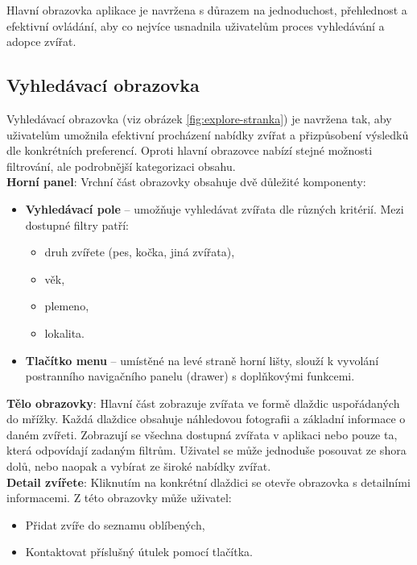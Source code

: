 \documentclass[czech, bp, kiv, he, iso690numb, pdf]{fasthesis}
\begin{document}
    \noindent Hlavní obrazovka aplikace je navržena s důrazem na jednoduchost, přehlednost a efektivní ovládání, aby co nejvíce usnadnila uživatelům proces vyhledávání a adopce zvířat.

    \subsection{Vyhledávací obrazovka}

    \noindent Vyhledávací obrazovka (viz obrázek \ref{fig:explore-stranka}) je navržena tak, aby uživatelům umožnila efektivní procházení nabídky zvířat a přizpůsobení výsledků dle konkrétních preferencí. Oproti hlavní obrazovce nabízí stejné možnosti filtrování, ale podrobnější kategorizaci obsahu.\\

    \noindent \textbf{Horní panel}: Vrchní část obrazovky obsahuje dvě důležité komponenty:

    \begin{itemize}[leftmargin=2em]
        \item \textbf{Vyhledávací pole} – umožňuje vyhledávat zvířata dle různých kritérií. Mezi dostupné filtry patří:
        \begin{itemize}
            \item druh zvířete (pes, kočka, jiná zvířata),
            \item věk,
            \item plemeno,
            \item lokalita.
        \end{itemize}

        \item \textbf{Tlačítko menu} – umístěné na levé straně horní lišty, slouží k vyvolání postranního navigačního panelu (drawer) s doplňkovými funkcemi.
    \end{itemize}

    \noindent \textbf{Tělo obrazovky}: Hlavní část zobrazuje zvířata ve formě dlaždic uspořádaných do mřížky. Každá dlaždice obsahuje náhledovou fotografii a základní informace o daném zvířeti. Zobrazují se všechna dostupná zvířata v aplikaci nebo pouze ta, která odpovídají zadaným filtrům. Uživatel se může jednoduše posouvat ze shora dolů, nebo naopak a vybírat ze široké nabídky zvířat.\\

    \noindent \textbf{Detail zvířete}: Kliknutím na konkrétní dlaždici se otevře obrazovka s detailními informacemi. Z této obrazovky může uživatel:
    \begin{itemize}
        \item Přidat zvíře do seznamu oblíbených,
        \item Kontaktovat příslušný útulek pomocí tlačítka.
    \end{itemize}
\end{document}
